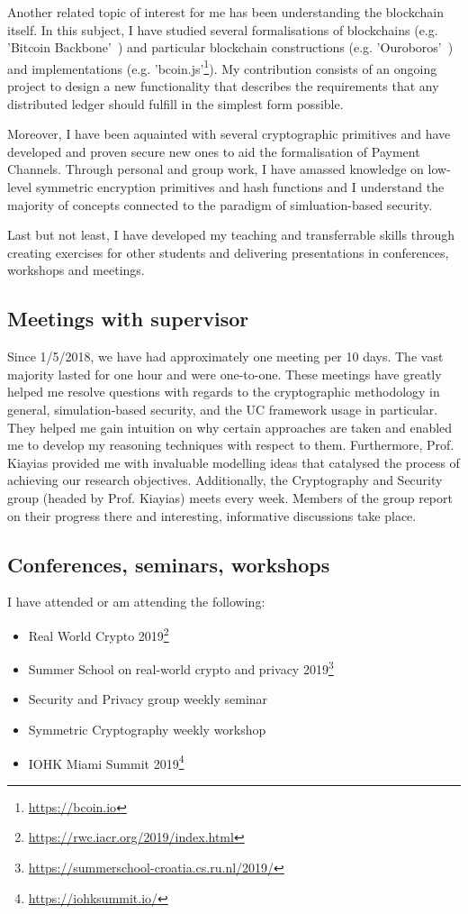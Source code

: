     Another related topic of interest for me has been understanding the
    blockchain itself. In this subject, I have studied several formalisations of
    blockchains (e.g. 'Bitcoin Backbone'~\cite{garay2015bitcoin}) and particular
    blockchain constructions (e.g. 'Ouroboros'~\cite{kiayias2017ouroboros}) and
    implementations (e.g. 'bcoin.js'\footnote{\url{https://bcoin.io}}). My
    contribution consists of an ongoing project to design a new functionality
    that describes the requirements that any distributed ledger should fulfill
    in the simplest form possible.

    Moreover, I have been aquainted with several cryptographic primitives and
    have developed and proven secure new ones to aid the formalisation of
    Payment Channels. Through personal and group work, I have amassed knowledge
    on low-level symmetric encryption primitives and hash functions and I
    understand the majority of concepts connected to the paradigm of
    simluation-based security.

    Last but not least, I have developed my teaching and transferrable skills
    through creating exercises for other students and delivering presentations
    in conferences, workshops and meetings.

  \subsection{Meetings with supervisor}
    Since 1/5/2018, we have had approximately one meeting per 10 days. The vast
    majority lasted for one hour and were one-to-one. These meetings have
    greatly helped me resolve questions with regards to the cryptographic
    methodology in general, simulation-based security, and the UC framework
    usage in particular. They helped me gain intuition on why certain approaches
    are taken and enabled me to develop my reasoning techniques with respect to
    them. Furthermore, Prof. Kiayias provided me with invaluable modelling ideas
    that catalysed the process of achieving our research objectives.
    Additionally, the Cryptography and Security group (headed by Prof. Kiayias)
    meets every week. Members of the group report on their progress there and
    interesting, informative discussions take place.

  \subsection{Conferences, seminars, workshops}
    I have attended or am attending the following:
    \begin{itemize}
      \item Real World Crypto
      2019\footnote{\url{https://rwc.iacr.org/2019/index.html}}
      \item Summer School on real-world crypto and privacy
      2019\footnote{\url{https://summerschool-croatia.cs.ru.nl/2019/}}
      \item Security and Privacy group weekly seminar
      \item Symmetric Cryptography weekly workshop
      \item IOHK Miami Summit 2019\footnote{\url{https://iohksummit.io/}}
    \end{itemize}

